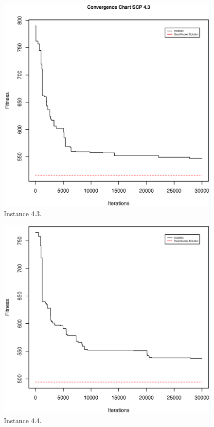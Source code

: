 \begin{figure}[!htb]
\centering
\includegraphics[scale=.45]{Resultados/scp43.eps}
\caption{Instance 4.3.}
\label{fig:Instance.4.3}
\end{figure}

\begin{figure}[!htb]
\centering
\includegraphics[scale=.45]{Resultados/scp44.eps}
\caption{Instance 4.4.}
\label{fig:Instance.4.4}
\end{figure}